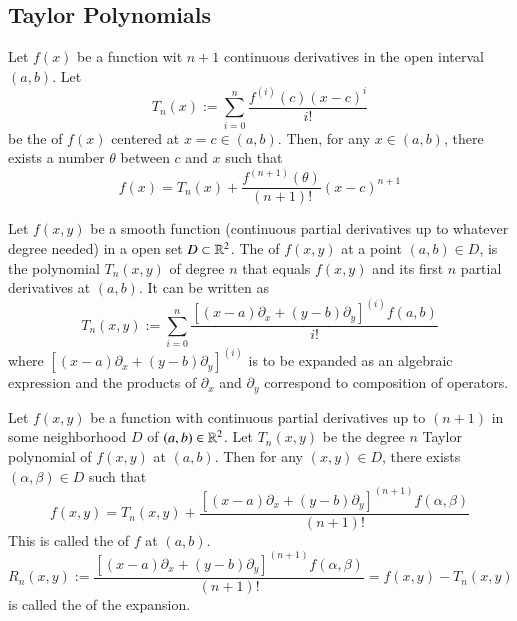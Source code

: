 \begin{appendices}
    
    \subsection{Taylor Polynomials}
    
    \begin{namthm}
        Let $f(x)$ be a function wit $n+1$ continuous derivatives in the open interval $(a,b)$. Let \begin{equation}
            T_n(x) := \sum\limits_{i=0}^n\frac{f^{(i)}(c)(x-c)^i}{i!}
        \end{equation}
        be the  of $f(x)$ centered at $x = c \in (a,b)$. Then, for any $x \in (a,b)$, there exists a number $\theta$ between $c$ and $x$ such that \begin{equation}
            f(x) = T_n(x) + \frac{f^{(n+1)}(\theta)}{(n+1)!}(x-c)^{n+1}
        \end{equation}
    \end{namthm}
    
    \begin{defn}
        Let $f(x,y)$ be a smooth function (continuous partial derivatives up to whatever degree needed) in a open set $D \subset \mathbb R^2$. The  of $f(x,y)$ at a point $(a,b) \in D$, is the polynomial $T_n(x,y)$ of degree $n$ that equals $f(x,y)$ and its first $n$ partial derivatives at $(a,b)$. It can be written as \begin{equation}
            T_n(x,y) := \sum\limits_{i=0}^n\frac{\left[(x-a)\partial_x + (y-b)\partial_y\right]^{(i)}f(a,b)}{i!}
        \end{equation}
        where $\left[(x-a)\partial_x + (y-b)\partial_y\right]^{(i)}$ is to be expanded as an algebraic expression and the products of $\partial_x$ and $\partial_y$ correspond to composition of operators.
    \end{defn}
    
    \begin{namthm}
        Let $f(x,y)$ be a function with continuous partial derivatives up to $(n+1)$ in some neighborhood $D$ of $(a,b) \in \mathbb R^2$. Let $T_n(x,y)$ be the degree $n$ Taylor polynomial of $f(x,y)$ at $(a,b)$. Then for any $(x,y) \in D$, there exists $(\alpha,\beta) \in D$ such that \begin{equation}
            f(x,y) = T_n(x,y) + \frac{\left[(x-a)\partial_x + (y-b)\partial_y\right]^{(n+1)}f(\alpha,\beta)}{(n+1)!}
        \end{equation}
        This is called the  of $f$ at $(a,b)$. \begin{equation}
            R_n(x,y) := \frac{\left[(x-a)\partial_x + (y-b)\partial_y\right]^{(n+1)}f(\alpha,\beta)}{(n+1)!} = f(x,y) - T_n(x,y)
        \end{equation}
        is called the  of the expansion.
    \end{namthm}
    

\end{appendices}
